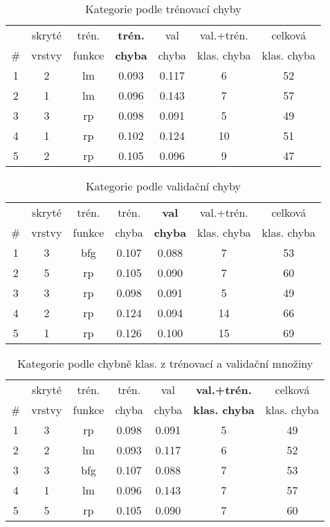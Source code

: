 \documentclass[journal]{IEEEtrancz}
\begin{document}
\begin{table}[h]
  \centering
  \caption{Kategorie podle trénovací chyby}
  \begin{tabular}{|c|c|c|c|c|c|c|}
  \hline
   &skryté & trén. & \textbf{trén.} & val & val.+trén. & celková \\
  \#  &vrstvy & funkce & \textbf{chyba} & chyba & klas. chyba & klas. chyba \\
  \hline
  \hline
  1 & 2  &  lm  &  0.093  &  0.117  &  6 & 52 \\
  2 & 1  &  lm  &  0.096  &  0.143  &  7 & 57 \\
  3 & 3  &  rp  &  0.098  &  0.091  &  5 & 49 \\
  4 & 1  &  rp  &  0.102  &  0.124  & 10 & 51\\
  5 & 2  &  rp  &  0.105  &  0.096  &  9 & 47\\
  \hline
  \end{tabular}
  \label{tab:tperf}
\end{table}

\begin{table}[h]
  \centering
  \caption{Kategorie podle validační chyby}
  \begin{tabular}{|c|c|c|c|c|c|c|}
  \hline
   &skryté & trén. & trén. & \textbf{val} & val.+trén. & celková \\
  \#  &vrstvy & funkce & chyba & \textbf{chyba }& klas. chyba & klas. chyba \\
  \hline
  \hline
  1&3&bfg&0.107&0.088&7&53\\
  2&5&rp&0.105&0.090&7&60\\
  3&3&rp&0.098&0.091&5&49\\
  4&2&rp&0.124&0.094&14&66\\
  5&1&rp&0.126&0.100&15&69\\
  \hline
  \end{tabular}
  \label{tab:vperf}
\end{table}

\begin{table}[h]
  \centering
  \caption{Kategorie podle chybně klas. z trénovací a validační množiny}
  \begin{tabular}{|c|c|c|c|c|c|c|}
  \hline
   &skryté & trén. & trén. & val & \textbf{val.+trén.} & celková \\
  \#  &vrstvy & funkce & chyba & chyba & \textbf{klas. chyba }& klas. chyba \\
  \hline
  \hline
1&3&rp&0.098&0.091&5&49\\
2&2&lm&0.093&0.117&6&52\\
3&3&bfg&0.107&0.088&7&53\\
4&1&lm&0.096&0.143&7&57\\
5&5&rp&0.105&0.090&7&60\\
  \hline
  \end{tabular}
  \label{tab:tvklas}
\end{table}
\end{document}
